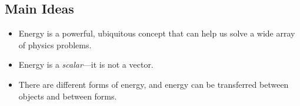 \documentclass[]{article}
\begin{document}
\newpage
\begin{TeacherMargin}

\end{TeacherMargin}
\begin{PresentSpace}
\section*{Main Ideas}
\begin{itemize}
	\item Energy is a powerful, ubiquitous concept that can help us solve a wide array of physics problems.
	\item Energy is a \textit{scalar}---it is not a vector.
	\item There are different forms of energy, and energy can be transferred between objects and between forms.
\end{itemize}
\end{PresentSpace}
\end{document}
